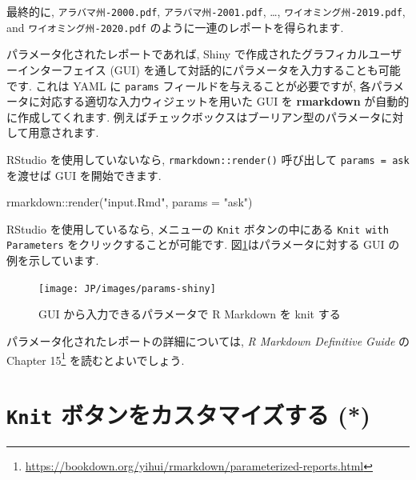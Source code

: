 \documentclass[
  11pt,
  lualatex,ja=standard,jafont=noto]{bxjsreport}
\newenvironment{Shaded}{\begin{snugshade}}{\end{snugshade}}
\newcommand{\AttributeTok}[1]{\textcolor[rgb]{0.77,0.63,0.00}{#1}}
\newcommand{\FunctionTok}[1]{\textcolor[rgb]{0.00,0.00,0.00}{#1}}
\newcommand{\NormalTok}[1]{#1}
\newcommand{\SpecialCharTok}[1]{\textcolor[rgb]{0.00,0.00,0.00}{#1}}
\newcommand{\StringTok}[1]{\textcolor[rgb]{0.31,0.60,0.02}{#1}}
\renewcommand{\href}[2]{#2\footnote{\url{#1}}}
\begin{document}
最終的に, \texttt{アラバマ州-2000.pdf}, \texttt{アラバマ州-2001.pdf}, \ldots, \texttt{ワイオミング州-2019.pdf}, and \texttt{ワイオミング州-2020.pdf} のように一連のレポートを得られます.

パラメータ化されたレポートであれば, Shiny で作成されたグラフィカルユーザーインターフェイス (GUI) を通して対話的にパラメータを入力することも可能です. これは YAML に \texttt{params} フィールドを与えることが必要ですが, 各パラメータに対応する適切な入力ウィジェットを用いた GUI を \textbf{rmarkdown} が自動的に作成してくれます. 例えばチェックボックスはブーリアン型のパラメータに対して用意されます.

RStudio を使用していないなら, \texttt{rmarkdown::render()} 呼び出して \texttt{params = \textquotesingle{}ask\textquotesingle{}} を渡せば GUI を開始できます.

\begin{Shaded}
\begin{Highlighting}[numbers=left,,]
\NormalTok{rmarkdown}\SpecialCharTok{::}\FunctionTok{render}\NormalTok{(}\StringTok{"input.Rmd"}\NormalTok{, }\AttributeTok{params =} \StringTok{"ask"}\NormalTok{)}
\end{Highlighting}
\end{Shaded}

RStudio を使用しているなら, メニューの \texttt{Knit} ボタンの中にある \texttt{Knit with Parameters} をクリックすることが可能です. 図\ref{fig:params-shiny}はパラメータに対する GUI の例を示しています.

\begin{figure}

{\centering \texttt{[image: JP/images/params-shiny]} 

}

\caption{GUI から入力できるパラメータで R Markdown を knit する}\label{fig:params-shiny}
\end{figure}

パラメータ化されたレポートの詳細については, \emph{R Markdown Definitive Guide} \autocite{rmarkdown2018} の \href{https://bookdown.org/yihui/rmarkdown/parameterized-reports.html}{Chapter 15} を読むとよいでしょう.

\hypertarget{custom-knit}{%
\section{\texorpdfstring{\texttt{Knit} ボタンをカスタマイズする (*)}{Knit ボタンをカスタマイズする (*)}}\label{custom-knit}}
\end{document}
